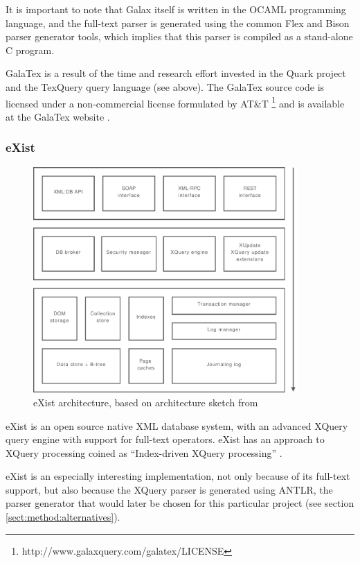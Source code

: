 It is important to note that Galax itself is written in the OCAML programming
language, and the full-text parser is generated using the common Flex and Bison
parser generator tools, which implies that this parser is compiled as a
stand-alone C program.

GalaTex is a result of the time and research effort invested in the Quark
project and the TexQuery query language (see above). The GalaTex
source code is licensed under a non-commercial license formulated by AT\&{}T 
\footnote{http://www.galaxquery.com/galatex/LICENSE} and is available at the
GalaTex website \cite{galatex}.

\subsubsection{eXist}
\label{sect:stateOfTheArt:eXist}

\begin{figure}[!h]
  \centering
    \includegraphics[width=0.9\textwidth]{diagrams/exist_arch}
  \caption[eXist architecture]{eXist architecture, based on architecture sketch
  from \cite{exist_indexdriven}}
\end{figure}

eXist is an open source native XML database system, with an advanced XQuery
query engine with support for full-text operators. eXist has an approach to
XQuery processing coined as ``Index-driven XQuery processing''
\cite{exist_idx_drv_query}.

eXist is an especially interesting implementation, not only because of its
full-text support, but also because the XQuery parser is generated using
ANTLR, the parser generator that would later be chosen for this particular
project (see section \ref{sect:method:alternatives}).

